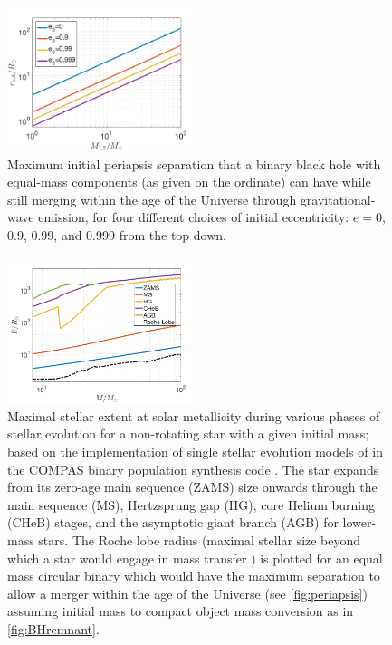 \documentclass[iop,onecolumn]{revtex4-1}
\begin{document}
\begin{figure}
	\centering
	\includegraphics[width=0.5\textwidth]{M-rp-log.png}
	\caption{Maximum initial periapsis separation that a binary black hole with equal-mass components (as given on the ordinate) can have while still merging within the age of the Universe through gravitational-wave emission, for four different choices of initial eccentricity: $e=0$, 0.9, 0.99, and 0.999 from the top down.\label{fig:periapsis}}
\end{figure}
	
\begin{figure}
	\centering	
	\includegraphics[width=0.5\textwidth]{StellarRadiusZsolarRoche.png}
\caption{Maximal stellar extent at solar metallicity during various phases of stellar evolution for a non-rotating star with a given initial mass; based on the implementation of single stellar evolution models of \citet{Hurley:2000} in the COMPAS binary population synthesis code \citep{Stevenson:2017}.   The star expands from its zero-age main sequence (ZAMS) size onwards through the main sequence (MS), Hertzsprung gap (HG), core Helium burning (CHeB) stages, and the asymptotic giant branch (AGB) for lower-mass stars.  The Roche lobe radius (maximal stellar size beyond which a star would engage in mass transfer \citep{Eggleton:1983}) is plotted for an equal mass circular binary which would have the maximum separation to allow a merger within the age of the Universe (see \autoref{fig:periapsis}) assuming initial mass to compact object mass conversion as in \autoref{fig:BHremnant}.\label{fig:Rmax} }
\end{figure}
\end{document}
